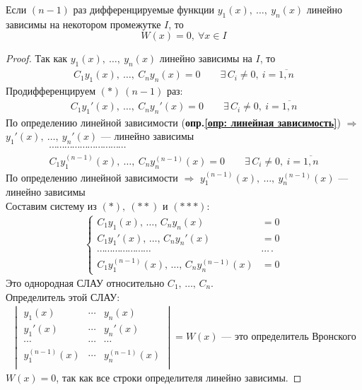 \begin{theorem}
    Если $(n-1)$ раз дифференцируемые функции $y_1(x),\ \ldots,\ y_n(x)$ линейно зависимы на некотором промежутке $I$, то
    \[
        W(x) = 0,\ \forall x \in I
    \]
\end{theorem}
\begin{proof}
    Так как $y_1(x),\ \ldots,\ y_n(x)$ линейно зависимы на $I$, то
    \begin{gather*}
        \boxed{C_1 y_1(x),\ \ldots,\ C_n y_n(x) = 0}\qquad \exists\, C_i \ne 0,\ i = \overline{1,n} \tag{$*$}
    \end{gather*}
    Продифференцируем $(*)\ (n-1)$ раз:
    \begin{gather*}
        \boxed{C_1 y_1'(x),\ \ldots,\ C_n y_n'(x) = 0}\qquad \exists\, C_i \ne 0,\ i = \overline{1,n} \tag{$**$}
    \end{gather*}
    По определению линейной зависимости (\textbf{опр.\ref{опр: линейная зависимость}}) $\Rightarrow$ $y_1'(x),\ \ldots,\ y_n'(x)$ --- линейно зависимы
    \begin{gather*}
        \cdots\cdots\cdots\cdots\cdots\cdots\cdots\cdots\cdots\cdots \\
        \boxed{C_1 y_1^{(n-1)}(x),\ \ldots,\ C_n y_n^{(n-1)}(x) = 0}\qquad \exists\, C_i \ne 0,\ i = \overline{1,n} \tag{$***$}
    \end{gather*}    
    По определению линейной зависимости $\Rightarrow$ $y_1^{(n-1)}(x),\ \ldots,\ y_n^{(n-1)}(x)$ --- линейно зависимы \\
    Составим систему из $(*),\ (**)$ и $(***)$:
    \begin{gather*}
        \left\{ \begin{aligned}
            C_1 y_1(x),\, \ldots,\, C_n y_n(x) &= 0 \\
            C_1 y_1'(x),\, \ldots,\, C_n y_n'(x) &= 0 \\
            \cdots\cdots\cdots\cdots\cdots\cdots\cdots&\cdots\cdot \\
            C_1 y_1^{(n-1)}(x),\, \ldots,\, C_n y_n^{(n-1)}(x) &= 0
        \end{aligned} \right.
    \end{gather*}
    Это однородная СЛАУ относительно $C_1,\, \ldots,\, C_n$. \\
    Определитель этой СЛАУ:
    \begin{gather*}
        \begin{vmatrix}
            y_1(x) & \cdots & y_n(x) \\
            y_1'(x) & \cdots & y_n'(x) \\
            \cdots & \cdots & \cdots \\
            y_1^{(n-1)}(x) & \cdots & y_n^{(n-1)}(x) \\
        \end{vmatrix} = W(x) \text{ --- это определитель Вронского}
    \end{gather*}
    $W(x) = 0$, так как все строки определителя линейно зависимы.
\end{proof}

